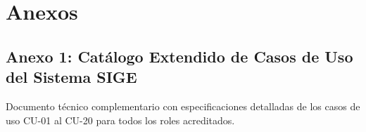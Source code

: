 \documentclass[12pt,a4paper]{article}
\begin{document}
\vspace{0.4cm}

\section{Anexos}
\subsection*{Anexo 1: Catálogo Extendido de Casos de Uso del Sistema SIGE}
Documento técnico complementario con especificaciones detalladas de los casos de uso CU-01 al CU-20 para todos los roles acreditados.
\end{document}

